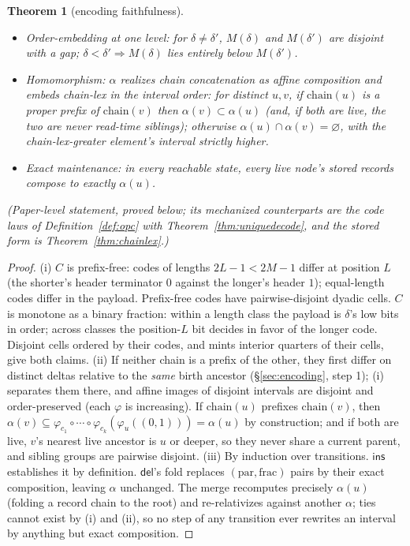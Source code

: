 \documentclass[11pt]{article}
\newtheorem{theorem}{Theorem}[section]
\newcommand{\del}{\mathsf{del}}
\newcommand{\ins}{\mathsf{ins}}
\newcommand{\chain}{\mathrm{chain}}
\begin{document}
\begin{theorem}[encoding faithfulness]\label{thm:faithful}
\begin{itemize}
\item[(i)] \emph{Order-embedding at one level:} for $\delta \ne
\delta'$, $M(\delta)$ and $M(\delta')$ are disjoint with a gap;
$\delta < \delta' \Rightarrow M(\delta)$ lies entirely below
$M(\delta')$.
\item[(ii)] \emph{Homomorphism:} $\alpha$ realizes chain
concatenation as affine composition and embeds chain-lex in the
interval order: for distinct $u, v$, if $\chain(u)$ is a proper
prefix of $\chain(v)$ then $\alpha(v) \subset \alpha(u)$ (and, if
both are live, the two are never read-time siblings); otherwise
$\alpha(u) \cap \alpha(v) = \varnothing$, with the chain-lex-greater
element's interval strictly higher.
\item[(iii)] \emph{Exact maintenance:} in every reachable state,
every live node's stored records compose to exactly $\alpha(u)$.
\end{itemize}
\noindent (Paper-level statement, proved below; its mechanized
counterparts are the code laws of Definition~\ref{def:opc} with
Theorem~\ref{thm:uniquedecode}, and the stored form is
Theorem~\ref{thm:chainlex}.)
\end{theorem}
\begin{proof}
(i) $C$ is prefix-free: codes of lengths $2L{-}1 < 2M{-}1$ differ at
position $L$ (the shorter's header terminator $0$ against the longer's
header $1$); equal-length codes differ in the payload. Prefix-free
codes have pairwise-disjoint dyadic cells. $C$ is monotone as a binary
fraction: within a length class the payload is $\delta$'s low bits in
order; across classes the position-$L$ bit decides in favor of the
longer code. Disjoint cells ordered by their codes, and mints interior
quarters of their cells, give both claims.
(ii) If neither chain is a prefix of the other, they first differ on
distinct deltas relative to the \emph{same} birth ancestor
(\S\ref{sec:encoding}, step 1); (i) separates them there, and affine
images of disjoint intervals are disjoint and order-preserved (each
$\varphi$ is increasing). If $\chain(u)$ prefixes $\chain(v)$, then
$\alpha(v) \subseteq \varphi_{c_1} \circ \cdots \circ
\varphi_{c_k}(\varphi_u((0,1))) = \alpha(u)$ by construction; and if
both are live, $v$'s nearest live ancestor is $u$ or deeper, so
they never share a current parent, and sibling groups are pairwise
disjoint.
(iii) By induction over transitions. $\ins$ establishes it by
definition. $\del$'s fold replaces $(\mathrm{par}, \mathrm{frac})$
pairs by their exact composition, leaving $\alpha$ unchanged. The merge
recomputes precisely $\alpha(u)$ (folding a record chain to the root)
and re-relativizes against another $\alpha$; ties cannot exist by
(i) and (ii), so no step of any transition ever rewrites an interval
by anything but exact composition.
\end{proof}
\end{document}
